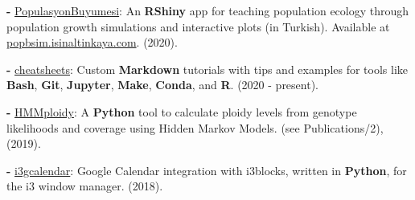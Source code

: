 \documentclass[letterpaper,10.5pt]{article}
\begin{document}
\textbf{-}  \href{https://github.com/isinaltinkaya/PopulasyonBuyumesi}{PopulasyonBuyumesi}: An \textbf{RShiny} app for teaching population ecology through population growth simulations and interactive plots (in Turkish). Available at \href{popbsim.isinaltinkaya.com/}{popbsim.isinaltinkaya.com}. (2020). \\
\smallskip

\textbf{-}  \href{https://github.com/isinaltinkaya/cheatsheets}{cheatsheets}: Custom \textbf{Markdown} tutorials with tips and examples for tools like \textbf{Bash}, \textbf{Git}, \textbf{Jupyter}, \textbf{Make}, \textbf{Conda}, and \textbf{R}. (2020 - present). \\
\smallskip

\textbf{-}  \href{https://github.com/SamueleSoraggi/HMMploidy}{HMMploidy}: A \textbf{Python} tool to calculate ploidy levels from genotype likelihoods and coverage using Hidden Markov Models. (see Publications/2), (2019).\\
\smallskip

\textbf{-}  \href{https://github.com/isinaltinkaya/i3gcalendar}{i3gcalendar}: Google Calendar integration with i3blocks, written in \textbf{Python}, for the i3 window manager. (2018). \\
\smallskip


\end{document}

